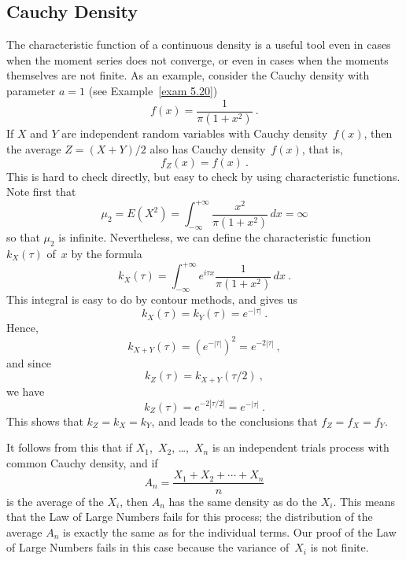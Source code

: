 \subsection*{Cauchy Density}
The characteristic function of a continuous density is a useful tool even in
cases when the moment series does not converge, or even in cases when the
moments themselves are not finite.  As an example, consider the Cauchy density
with parameter $a = 1$ (see Example~\ref{exam 5.20})
$$
f(x) = \frac1{\pi(1 + x^2)}\ .
$$
If $X$ and $Y$ are independent random variables with Cauchy density~$f(x)$,
then the average $Z = (X + Y)/2$ also has Cauchy density~$f(x)$, that is,
$$
f_Z(x) = f(x)\ .
$$
This is hard to check directly, but easy to check by using characteristic
functions.  Note first that
$$
\mu_2 = E(X^2) = \int_{-\infty}^{+\infty} \frac{x^2}{\pi(1 + x^2)}\, dx = \infty
$$
so that $\mu_2$ is infinite.  Nevertheless, we can define the characteristic
function $k_X(\tau)$ of~$x$ by the formula
$$
k_X(\tau) = \int_{-\infty}^{+\infty} e^{i\tau x}\frac1{\pi(1 + x^2)}\, dx\ .
$$
This integral is easy to do by contour methods, and gives us
$$
k_X(\tau) = k_Y(\tau) = e^{-|\tau|}\ .
$$
Hence,
$$
k_{X + Y}(\tau) = (e^{-|\tau|})^2 = e^{-2|\tau|}\ ,
$$
and since
$$
k_Z(\tau) = k_{X + Y}(\tau/2)\ ,
$$
we have
$$
k_Z(\tau) = e^{-2|\tau/2|} = e^{-|\tau|}\ .
$$
This shows that $k_Z = k_X = k_Y$, and leads to the conclusions that $f_Z = f_X
= f_Y$.

It follows from this that if $X_1$,~$X_2$, \ldots,~$X_n$ is an independent
trials process with common Cauchy density, and if
$$
A_n = \frac{X_1 + X_2 + \cdots+ X_n}n
$$
is the average of the $X_i$, then $A_n$ has the same density as do the $X_i$. 
This means that the Law of Large Numbers fails for this process; the
distribution of the average $A_n$ is exactly the same as for the individual
terms.  Our proof of the Law of Large Numbers fails in this case because the
variance of~$X_i$ is not finite.

